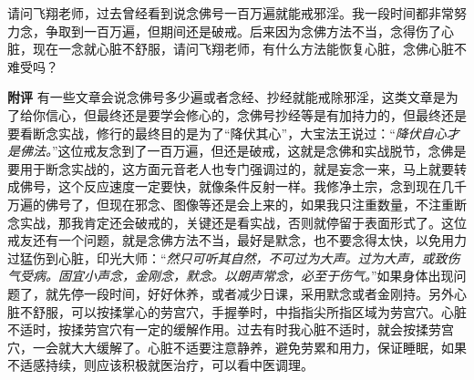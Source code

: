 \begin{case}
    请问飞翔老师，过去曾经看到说念佛号一百万遍就能戒邪淫。我一段时间都非常努力念，争取到一百万遍，但期间还是破戒。后来因为念佛方法不当，念得伤了心脏，现在一念就心脏不舒服，请问飞翔老师，有什么方法能恢复心脏，念佛心脏不难受吗？

    \textbf{附评} 有一些文章会说念佛号多少遍或者念经、抄经就能戒除邪淫，这类文章是为了给你信心，但最终还是要学会修心的，念佛号抄经等是有加持力的，但最终还是要看断念实战，修行的最终目的是为了“降伏其心”，大宝法王说过：“\textit{降伏自心才是佛法。}”这位戒友念到了一百万遍，但还是破戒，这就是念佛和实战脱节，念佛是要用于断念实战的，这方面元音老人也专门强调过的，就是妄念一来，马上就要转成佛号，这个反应速度一定要快，就像条件反射一样。我修净土宗，念到现在几千万遍的佛号了，但现在邪念、图像等还是会上来的，如果我只注重数量，不注重断念实战，那我肯定还会破戒的，关键还是看实战，否则就停留于表面形式了。这位戒友还有一个问题，就是念佛方法不当，最好是默念，也不要念得太快，以免用力过猛伤到心脏，印光大师：“\textit{然只可听其自然，不可过为大声。过为大声，或致伤气受病。固宜小声念，金刚念，默念。以朗声常念，必至于伤气。}”如果身体出现问题了，就先停一段时间，好好休养，或者减少日课，采用默念或者金刚持。另外心脏不舒服，可以按揉掌心的劳宫穴，手握拳时，中指指尖所指区域为劳宫穴。心脏不适时，按揉劳宫穴有一定的缓解作用。过去有时我心脏不适时，就会按揉劳宫穴，一会就大大缓解了。心脏不适要注意静养，避免劳累和用力，保证睡眠，如果不适感持续，则应该积极就医治疗，可以看中医调理。
\end{case}

